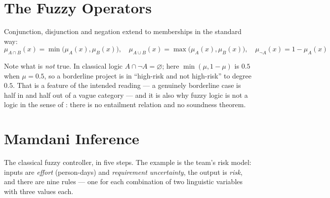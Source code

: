 \section{The Fuzzy Operators}

Conjunction, disjunction and negation extend to memberships in the standard way:
\[
  \mu_{A \cap B}(x) = \min\bigl(\mu_{A}(x), \mu_{B}(x)\bigr), \quad
  \mu_{A \cup B}(x) = \max\bigl(\mu_{A}(x), \mu_{B}(x)\bigr), \quad
  \mu_{\neg A}(x) = 1 - \mu_{A}(x)
\]

Note what is \emph{not} true. In classical logic $A \cap \neg A = \varnothing$; here
$\min(\mu, 1-\mu)$ is $0.5$ when $\mu = 0.5$, so a borderline project is in
``high-risk and not high-risk'' to degree $0.5$. That is a feature of the intended
reading --- a genuinely borderline case is half in and half out of a vague category
--- and it is also why fuzzy logic is not a logic in the sense of
: there is no entailment relation and no soundness theorem.

\section{Mamdani Inference}

The classical fuzzy controller, in five steps. The example is the team's risk model:
inputs are \emph{effort} (person-days) and \emph{requirement uncertainty}, the
output is \emph{risk}, and there are nine rules --- one for each combination of two
linguistic variables with three values each.

